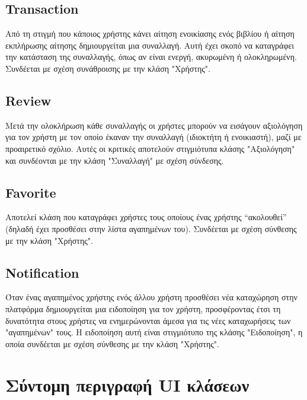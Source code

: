 \documentclass[12pt,a4paper]{article}
\begin{document}
\subsection{Transaction}
Από τη στιγμή που κάποιος χρήστης κάνει αίτηση ενοικίασης ενός βιβλίου ή αίτηση εκπλήρωσης αίτησης δημιουργείται μια συναλλαγή. Αυτή έχει σκοπό να καταγράφει την κατάσταση της συναλλαγής, όπως αν είναι ενεργή, ακυρωμένη ή ολοκληρωμένη. Συνδέεται με σχέση συνάθροισης με την κλάση "Χρήστης".

\subsection{Review}
Μετά την ολοκλήρωση κάθε συναλλαγής οι χρήστες μπορούν να εισάγουν αξιολόγηση για τον χρήστη με τον οποίο έκαναν την συναλλαγή (ιδιοκτήτη ή ενοικιαστή), μαζί με προαιρετικό σχόλιο. Αυτές οι κριτικές αποτελούν στιγμιότυπα κλάσης "Αξιολόγηση" και συνδέονται με την κλάση "Συναλλαγή" με σχέση σύνδεσης.


\subsection{Favorite}
Αποτελεί κλάση που καταγράφει χρήστες τους οποίους ένας χρήστης “ακολουθεί” (δηλαδή έχει προσθέσει στην λίστα αγαπημένων του). Συνδέεται με σχέση σύνθεσης με την κλάση "Χρήστης".

\subsection{Notification}
Όταν ένας αγαπημένος χρήστης ενός άλλου χρήστη προσθέσει νέα καταχώρηση στην πλατφόρμα δημιουργείται μια ειδοποίηση για τον χρήστη, προσφέροντας έτσι τη δυνατότητα στους χρήστες να ενημερώνονται άμεσα για τις νέες καταχωρήσεις των "αγαπημένων" τους. Η ειδοποίηση αυτή είναι στιγμιότυπο της κλάσης "Ειδοποίηση", η οποία συνδέεται με σχέση σύνθεσης με την κλάση "Χρήστης".

\section{Σύντομη περιγραφή UI κλάσεων}
\end{document}
